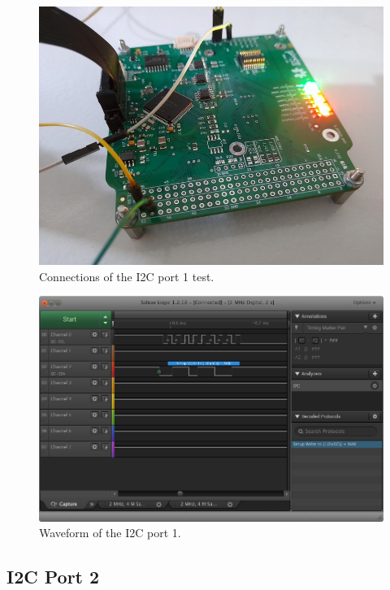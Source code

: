 \begin{figure}[!ht]
    \begin{center}
        \includegraphics[width=0.7\columnwidth]{figures/v05/test-i2c-1.jpg}
        \caption{Connections of the I2C port 1 test.}
        \label{fig:test-i2c-1}
    \end{center}
\end{figure}

\begin{figure}[!ht]
    \begin{center}
        \includegraphics[width=\columnwidth]{figures/v05/waveform-i2c-1.png}
        \caption{Waveform of the I2C port 1.}
        \label{fig:waveform-i2c-1}
    \end{center}
\end{figure}

\subsection{I2C Port 2}

